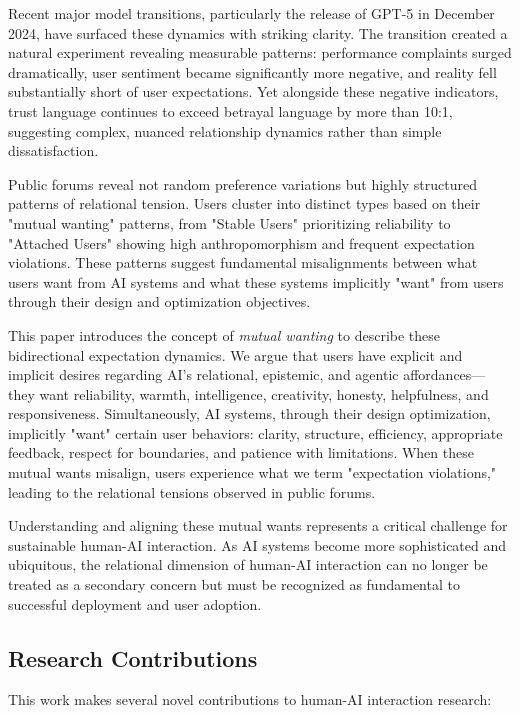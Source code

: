 \documentclass{article}
\begin{document}
Recent major model transitions, particularly the release of GPT-5 in December 2024, have surfaced these dynamics with striking clarity. The transition created a natural experiment revealing measurable patterns: performance complaints surged dramatically, user sentiment became significantly more negative, and reality fell substantially short of user expectations. Yet alongside these negative indicators, trust language continues to exceed betrayal language by more than 10:1, suggesting complex, nuanced relationship dynamics rather than simple dissatisfaction.

Public forums reveal not random preference variations but highly structured patterns of relational tension. Users cluster into distinct types based on their "mutual wanting" patterns, from "Stable Users" prioritizing reliability to "Attached Users" showing high anthropomorphism and frequent expectation violations. These patterns suggest fundamental misalignments between what users want from AI systems and what these systems implicitly "want" from users through their design and optimization objectives.

This paper introduces the concept of \emph{mutual wanting} to describe these bidirectional expectation dynamics. We argue that users have explicit and implicit desires regarding AI's relational, epistemic, and agentic affordances—they want reliability, warmth, intelligence, creativity, honesty, helpfulness, and responsiveness. Simultaneously, AI systems, through their design optimization, implicitly "want" certain user behaviors: clarity, structure, efficiency, appropriate feedback, respect for boundaries, and patience with limitations. When these mutual wants misalign, users experience what we term "expectation violations," leading to the relational tensions observed in public forums.

Understanding and aligning these mutual wants represents a critical challenge for sustainable human-AI interaction. As AI systems become more sophisticated and ubiquitous, the relational dimension of human-AI interaction can no longer be treated as a secondary concern but must be recognized as fundamental to successful deployment and user adoption.

\subsection{Research Contributions}

This work makes several novel contributions to human-AI interaction research:
\end{document}

